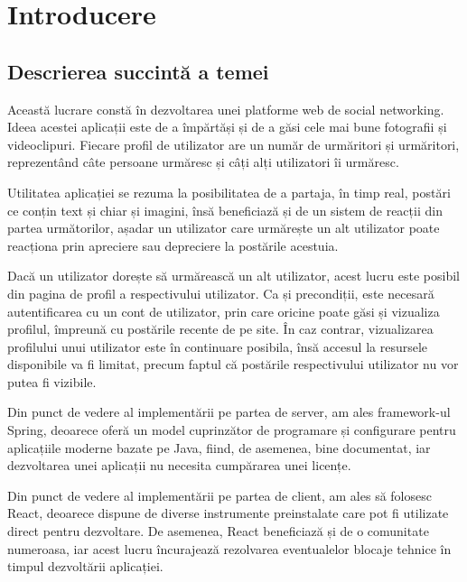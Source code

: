 \chapter{Introducere}
\section{Descrierea succintă a temei}

Această lucrare constă în dezvoltarea unei platforme web de social networking. Ideea acestei aplicații este de a împărtăși și de a găsi cele mai bune fotografii și videoclipuri. Fiecare profil de utilizator are un număr de urmăritori și urmăritori, reprezentând câte persoane urmăresc și câți alți utilizatori îi urmăresc.\newline

Utilitatea aplicației se rezuma la posibilitatea de a partaja, în timp real, postări ce conțin text și chiar și imagini, însă beneficiază și de un sistem de reacții din partea următorilor, așadar un utilizator care urmărește un alt utilizator poate reacționa prin apreciere sau depreciere la postările acestuia.\newline

Dacă un utilizator dorește să urmărească un alt utilizator, acest lucru este posibil din pagina de profil a respectivului utilizator. Ca și precondiții, este necesară autentificarea cu un cont de utilizator, prin care oricine poate găsi și vizualiza profilul, împreună cu postările recente de pe site. În caz contrar, vizualizarea profilului unui utilizator este în continuare posibila, însă accesul la resursele disponibile va fi limitat, precum faptul că postările respectivului utilizator nu vor putea fi vizibile.\newline

Din punct de vedere al implementării pe partea de server, am ales framework-ul Spring\cite{.springdoc}, deoarece oferă un model cuprinzător de programare și configurare pentru aplicațiile moderne bazate pe Java, fiind, de asemenea, bine documentat, iar dezvoltarea unei aplicații nu necesita cumpărarea unei licențe.\newline

Din punct de vedere al implementării pe partea de client, am ales să folosesc React\cite{.reactdoc}, deoarece dispune de diverse instrumente preinstalate care pot fi utilizate direct pentru dezvoltare. De asemenea, React beneficiază și de o comunitate numeroasa, iar acest lucru încurajează rezolvarea eventualelor blocaje tehnice în timpul dezvoltării aplicației.

